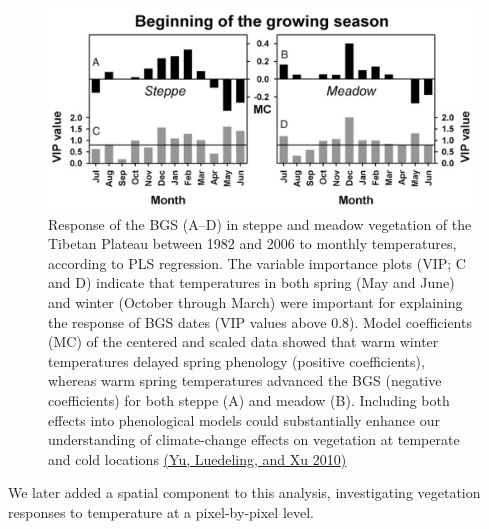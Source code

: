 \documentclass[
]{book}
\begin{document}
\begin{figure}
\centering
\includegraphics{pictures/PLS_Tibet_2.png}
\caption{Response of the BGS (A--D) in steppe and meadow vegetation of the Tibetan Plateau between 1982 and 2006 to monthly temperatures, according to PLS regression. The variable importance plots (VIP; C and D) indicate that temperatures in both spring (May and June) and winter (October through March) were important for explaining the response of BGS dates (VIP values above 0.8). Model coefficients (MC) of the centered and scaled data showed that warm winter temperatures delayed spring phenology (positive coefficients), whereas warm spring temperatures advanced the BGS (negative coefficients) for both steppe (A) and meadow (B). Including both effects into phenological models could substantially enhance our understanding of climate-change effects on vegetation at temperate and cold locations \href{https://www.pnas.org/content/pnas/107/51/22151.full.pdf}{(Yu, Luedeling, and Xu \protect\hyperlink{ref-yu2010winter}{2010})}}
\end{figure}

We later added a spatial component to this analysis, investigating vegetation responses to temperature at a pixel-by-pixel level.
\end{document}
